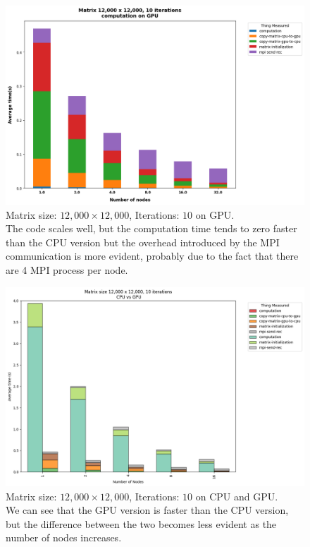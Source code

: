 \documentclass{article}
\begin{document}
    \begin{figure}
        \includegraphics[width=\textwidth]{./plots/plt03}
        \caption{Matrix size: $12,000 \times 12,000$, Iterations: $10$ on GPU.\\ The code scales well, but the computation time tends to zero faster than the CPU version but the overhead introduced by the MPI communication is more evident, probably due to the fact that there are 4 MPI process per node.}
        \label{fig:figure3}
    \end{figure}

    \begin{figure}
        \includegraphics[width=\textwidth]{./plots/plt05}
        \caption{Matrix size: $12,000 \times 12,000$, Iterations: $10$ on CPU and GPU.\\ We can see that the GPU version is faster than the CPU version, but the difference between the two becomes less evident as the number of nodes increases.}
        \label{fig:figure4}
    \end{figure}
\end{document}

